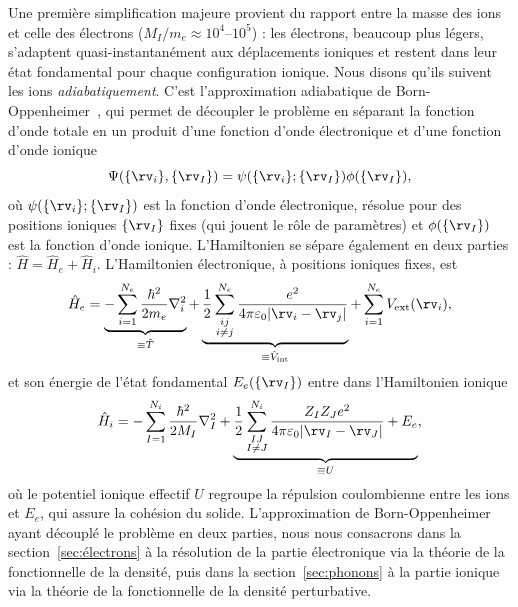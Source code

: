 Une première simplification majeure provient du rapport entre la masse des ions et celle des électrons ($M_I/m_e \approx 10^4$--$10^5$) : les électrons, beaucoup plus légers, s'adaptent quasi-instantanément aux déplacements ioniques et restent dans leur état fondamental pour chaque configuration ionique. Nous disons qu'ils suivent les ions \textit{adiabatiquement}. C'est l'approximation adiabatique de Born-Oppenheimer~\cite{bornZurQuantentheorieMolekeln1927}, qui permet de découpler le problème en séparant la fonction d'onde totale en un produit d'une fonction d'onde électronique et d'une fonction d'onde ionique
\begin{equation}
    \Psi(\{\rv_i\},\{\rv_I\})=\psi(\{\rv_i\};\{\rv_I\})\phi(\{\rv_I\}),
    \label{eqn:c2_BO}
\end{equation}
où $\psi(\{\rv_i\};\{\rv_I\})$ est la fonction d'onde électronique, résolue pour des positions ioniques $\{\rv_I\}$ fixes (qui jouent le rôle de paramètres) et $\phi(\{\rv_I\})$ est la fonction d'onde ionique. L'Hamiltonien se sépare également en deux parties : $\hat{H}=\hat{H}_e+\hat{H}_i$. L'Hamiltonien électronique, à positions ioniques fixes, est
\begin{equation}
    \hat{H}_e=\underbrace{-\sum_{i=1}^{N_e}\frac{\hbar^2}{2m_e}\nabla_i^2}_{\equiv \hat{T}}+\underbrace{\frac{1}{2}\sum_{\substack{ij \\ i\neq j}}^{N_e}\frac{e^2}{4\pi\varepsilon_0|\rv_i-\rv_j|}}_{\equiv \hat{V}_\text{int}}+\sum_{i=1}^{N_e}V_\text{ext}(\rv_i),
    \label{eqn:c2_He}
\end{equation}
et son énergie de l'état fondamental $E_e(\{\rv_I\})$ entre dans l'Hamiltonien ionique
\begin{equation}
    \hat{H}_i = -\sum_{I=1}^{N_i}\frac{\hbar^2}{2M_I}\nabla_I^2+\underbrace{\frac{1}{2}\sum_{\substack{IJ \\ I\neq J}}^{N_i}\frac{Z_IZ_Je^2}{4\pi\varepsilon_0|\rv_I-\rv_J|}+E_e}_{\equiv U},
    \label{eqn:c2_Hi}
\end{equation}
où le potentiel ionique effectif $U$ regroupe la répulsion coulombienne entre les ions et $E_e$, qui assure la cohésion du solide. L'approximation de Born-Oppenheimer ayant découplé le problème en deux parties, nous nous consacrons dans la section~\ref{sec:électrons} à la résolution de la partie électronique via la théorie de la fonctionnelle de la densité, puis dans la section~\ref{sec:phonons} à la partie ionique via la théorie de la fonctionnelle de la densité perturbative.

